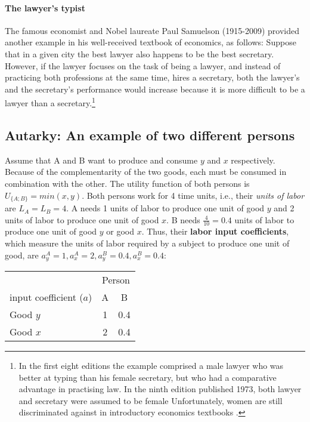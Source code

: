 {	\paragraph{The lawyer's typist}
	The famous economist and Nobel laureate Paul Samuelson (1915-2009) provided another example in his well-received textbook of economics, as follows: Suppose that in a given city the best lawyer also happens to be the best secretary. 
	However, if the lawyer focuses on the task of being a lawyer, and instead of practicing both professions at the same time, hires a secretary, both the lawyer's and the secretary's performance would increase because it is more difficult to be a lawyer than a secretary.\footnote{In the first eight editions the example comprised a
		male lawyer who was better at typing than his female secretary, but who had a comparative
		advantage in practising law. In the ninth edition published 1973, both lawyer and secretary were assumed to
		be female \citep[see][]{Backhouse2019Paul} Unfortunately, women are still discriminated against in introductory economics textbooks \citep[see][]{Stevenson2018Representations}.}
	
	

	
	
	\subsection{Autarky: An example of two different persons}\label{sec:exampleAB}
	
Assume that A and B want to produce and consume $y$ and $x$ respectively. Because of the complementarity of the two goods, each must be consumed in combination with the other. The utility function of both persons is $U_{\{A;B\}}=min(x,y)$. Both persons work for 4 time units, i.e., their \textit{units of labor} are $L_A=L_B=4$. A needs 1 units of labor to produce one unit of good $y$ and 2 units of labor to produce one unit of good $x$. B needs $\frac{4}{10}=0.4$ units of labor to produce one unit of good $y$ or good $x$. Thus, their \textbf{labor input coefficients}, which measure the units of labor required by a subject to produce one unit of good, are $a^A_y=1, a^A_x=2, a^B_y=0.4, a^B_x=0.4$:
			\begin{center}
		\begin{tabular}{lcc}\toprule
			&\multicolumn{2}{c}{Person}\\\cmidrule{2-3}
		input coefficient ($a$)	&A &B\\		\midrule
			Good $y$ & 1 & 0.4 \\
			Good $x$ & 2 & 0.4 \\\bottomrule
		\end{tabular}
	\end{center}\medskip

}
